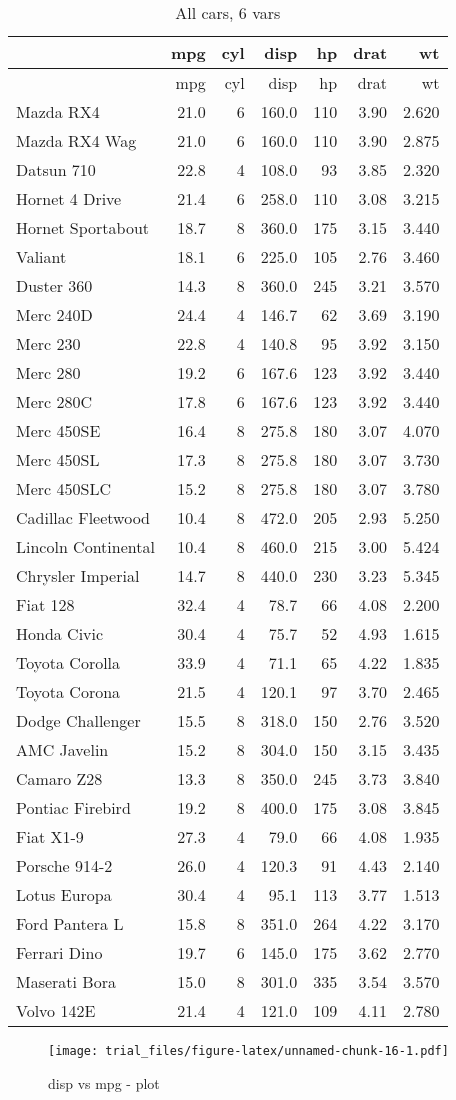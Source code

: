 \documentclass[]{article}
\begin{document}
\begin{longtable}[]{@{}lrrrrrr@{}}
\caption{All cars, 6 vars}\tabularnewline
\toprule
& mpg & cyl & disp & hp & drat & wt\tabularnewline
\midrule
\endfirsthead
\toprule
& mpg & cyl & disp & hp & drat & wt\tabularnewline
\midrule
\endhead
Mazda RX4 & 21.0 & 6 & 160.0 & 110 & 3.90 & 2.620\tabularnewline
Mazda RX4 Wag & 21.0 & 6 & 160.0 & 110 & 3.90 & 2.875\tabularnewline
Datsun 710 & 22.8 & 4 & 108.0 & 93 & 3.85 & 2.320\tabularnewline
Hornet 4 Drive & 21.4 & 6 & 258.0 & 110 & 3.08 & 3.215\tabularnewline
Hornet Sportabout & 18.7 & 8 & 360.0 & 175 & 3.15 & 3.440\tabularnewline
Valiant & 18.1 & 6 & 225.0 & 105 & 2.76 & 3.460\tabularnewline
Duster 360 & 14.3 & 8 & 360.0 & 245 & 3.21 & 3.570\tabularnewline
Merc 240D & 24.4 & 4 & 146.7 & 62 & 3.69 & 3.190\tabularnewline
Merc 230 & 22.8 & 4 & 140.8 & 95 & 3.92 & 3.150\tabularnewline
Merc 280 & 19.2 & 6 & 167.6 & 123 & 3.92 & 3.440\tabularnewline
Merc 280C & 17.8 & 6 & 167.6 & 123 & 3.92 & 3.440\tabularnewline
Merc 450SE & 16.4 & 8 & 275.8 & 180 & 3.07 & 4.070\tabularnewline
Merc 450SL & 17.3 & 8 & 275.8 & 180 & 3.07 & 3.730\tabularnewline
Merc 450SLC & 15.2 & 8 & 275.8 & 180 & 3.07 & 3.780\tabularnewline
Cadillac Fleetwood & 10.4 & 8 & 472.0 & 205 & 2.93 &
5.250\tabularnewline
Lincoln Continental & 10.4 & 8 & 460.0 & 215 & 3.00 &
5.424\tabularnewline
Chrysler Imperial & 14.7 & 8 & 440.0 & 230 & 3.23 & 5.345\tabularnewline
Fiat 128 & 32.4 & 4 & 78.7 & 66 & 4.08 & 2.200\tabularnewline
Honda Civic & 30.4 & 4 & 75.7 & 52 & 4.93 & 1.615\tabularnewline
Toyota Corolla & 33.9 & 4 & 71.1 & 65 & 4.22 & 1.835\tabularnewline
Toyota Corona & 21.5 & 4 & 120.1 & 97 & 3.70 & 2.465\tabularnewline
Dodge Challenger & 15.5 & 8 & 318.0 & 150 & 2.76 & 3.520\tabularnewline
AMC Javelin & 15.2 & 8 & 304.0 & 150 & 3.15 & 3.435\tabularnewline
Camaro Z28 & 13.3 & 8 & 350.0 & 245 & 3.73 & 3.840\tabularnewline
Pontiac Firebird & 19.2 & 8 & 400.0 & 175 & 3.08 & 3.845\tabularnewline
Fiat X1-9 & 27.3 & 4 & 79.0 & 66 & 4.08 & 1.935\tabularnewline
Porsche 914-2 & 26.0 & 4 & 120.3 & 91 & 4.43 & 2.140\tabularnewline
Lotus Europa & 30.4 & 4 & 95.1 & 113 & 3.77 & 1.513\tabularnewline
Ford Pantera L & 15.8 & 8 & 351.0 & 264 & 4.22 & 3.170\tabularnewline
Ferrari Dino & 19.7 & 6 & 145.0 & 175 & 3.62 & 2.770\tabularnewline
Maserati Bora & 15.0 & 8 & 301.0 & 335 & 3.54 & 3.570\tabularnewline
Volvo 142E & 21.4 & 4 & 121.0 & 109 & 4.11 & 2.780\tabularnewline
\bottomrule
\end{longtable}

\begin{figure}[htbp]
\centering
\texttt{[image: trial\_files/figure-latex/unnamed-chunk-16-1.pdf]}
\caption{disp vs mpg - plot}
\end{figure}
\end{document}
